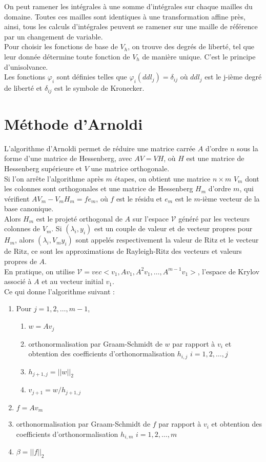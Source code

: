 On peut ramener les intégrales à une somme d'intégrales sur chaque mailles du domaine. Toutes ces mailles sont identiques à une transformation affine près, ainsi, tous les calculs d'intégrales peuvent se ramener sur une maille de référence par un changement de variable.\\

Pour choisir les fonctions de base de $V_h$, on trouve des degrés de liberté, tel que leur donnée détermine toute fonction de $V_h$ de manière unique. C'est le principe d'unisolvance.\\
Les fonctions $\varphi_i$ sont  définies telles que $\varphi_i(ddl_j)=\delta_{ij}$ où $ddl_j$ est le j-ième degré de liberté et $\delta_{ij}$ est le symbole de Kronecker.

\section{Méthode d'Arnoldi}
\label{arnoldi}
L'algorithme d'Arnoldi permet de réduire une matrice carrée $A$ d'ordre $n$ sous la forme d'une matrice de Hessenberg, avec $AV = VH$, où $H$ est une matrice de Hessenberg supérieure et $V$ une matrice orthogonale.\\
Si l'on arrête l'algorithme après $m$ étapes, on obtient une matrice $n\times m$ $V_m$ dont les colonnes sont orthogonales et une matrice de Hessenberg $H_m$ d'ordre $m$, qui vérifient $AV_m - V_mH_m = fe_m$, où $f$ est le résidu et $e_m$ est le $m$-ième vecteur de la base canonique.\\
Alors $H_m$ est le projeté orthogonal de $A$ sur l'espace $\mathcal{V}$ généré par les vecteurs colonnes de $V_m$. Si $(\lambda_i, y_i)$ est un couple de valeur et de vecteur propres pour $H_m$, alors $(\lambda_i, V_my_i)$ sont appelés respectivement la valeur de Ritz et le vecteur de Ritz, ce sont les approximations de Rayleigh-Ritz des vecteurs et valeurs propres de $A$.\\
En pratique, on utilise $\mathcal{V}= vec<v_1, Av_1, A^2v_1,\dots,A^{m-1}v_1>$, l'espace de Krylov associé à $A$ et au vecteur initial $v_1$.\\

Ce qui donne l'algorithme suivant :
\begin{enumerate}
\item Pour $j=1,2,\dots,m-1$,
\begin{enumerate}
\item $w=Av_j$
\item orthonormalisation par Graam-Schmidt de $w$ par rapport à $v_i$ et obtention des coefficients d'orthonormalisation $h_{i,j}$ $i=1,2,\dots,j$
\item $h_{j+1,j}=||w||_2$
\item $v_{j+1}=w/h_{j+1,j}$
\end{enumerate}
\item $f=Av_m$
\item orthonormalisation par Graam-Schmidt de $f$ par rapport à $v_i$ et obtention des coefficients d'orthonormalisation $h_{i,m}$ $i=1,2,\dots,m$
\item $\beta=||f||_2$
\end{enumerate}

